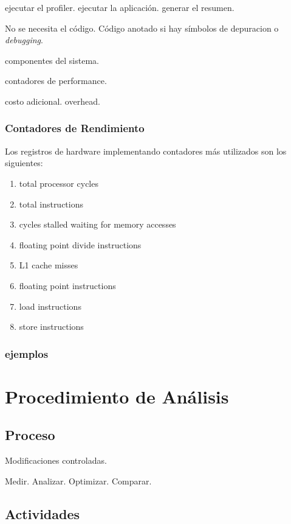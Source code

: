 \documentclass[a4paper]{report}
\begin{document}
ejecutar el profiler. ejecutar la aplicaci\'on. generar el resumen.

No se necesita el c\'odigo. C\'odigo anotado si hay s\'imbolos de depuracion o
{\it debugging}.

componentes del sistema.

contadores de performance.

costo adicional. overhead.

\subsection{Contadores de Rendimiento}

Los registros de hardware implementando contadores m\'as utilizados son los
siguientes:

\begin{enumerate}
\item total processor cycles
\item total instructions
\item cycles stalled waiting for memory accesses
\item floating point divide instructions
\item L1 cache misses
\item floating point instructions
\item load instructions
\item store instructions
\end{enumerate}

\subsection{ejemplos}

\chapter{Procedimiento de An\'alisis}

\section{Proceso}

Modificaciones controladas.

\bigskip

Medir. Analizar. Optimizar. Comparar.

\section{Actividades}
\end{document}
